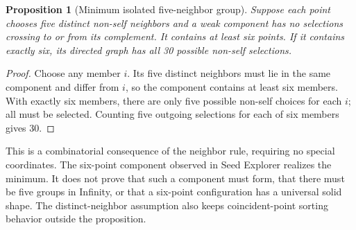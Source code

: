 \documentclass[11pt,a4paper]{article}
\newtheorem{proposition}{Proposition}
\begin{document}
\begin{proposition}[Minimum isolated five-neighbor group]\label{prop:six}
Suppose each point chooses five distinct non-self neighbors and a weak component has no selections crossing to or from its complement. It contains at least six points. If it contains exactly six, its directed graph has all 30 possible non-self selections.
\end{proposition}
\begin{proof}
Choose any member $i$. Its five distinct neighbors must lie in the same component and differ from $i$, so the component contains at least six members. With exactly six members, there are only five possible non-self choices for each $i$; all must be selected. Counting five outgoing selections for each of six members gives 30.
\end{proof}
This is a combinatorial consequence of the neighbor rule, requiring no special coordinates. The six-point component observed in Seed Explorer realizes the minimum. It does not prove that such a component must form, that there must be five groups in Infinity, or that a six-point configuration has a universal solid shape. The distinct-neighbor assumption also keeps coincident-point sorting behavior outside the proposition.
\end{document}
